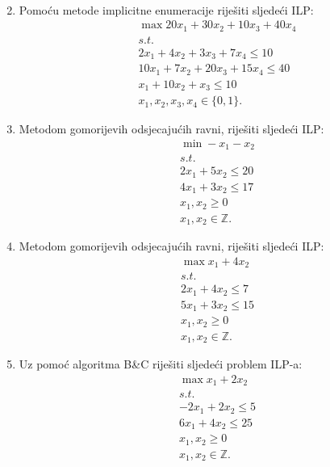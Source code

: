 \documentclass[a4paper, utf8, 11pt, colorlinks]{book}
\begin{document}
\begin{enumerate}
\begin{align*}
\end{align*}
\item  Pomoću metode implicitne enumeracije riješiti sljedeći ILP:
\begin{align*}
	 &\max 20 x_1 + 30 x_2 + 10 x_3 + 40 x_4 \\
	 &s.t. \\
	 & 2x_1 + 4 x_2 + 3 x_3 + 7 x_4 \leq 10 \\
	 & 10 x_1 + 7 x_2 + 20 x_3 + 15 x_4 \leq 40 \\
	 & x_1 + 10 x_2 + x_3 \leq 10 \\
	 & x_1, x_2, x_3, x_4 \in \{0, 1\}.
\end{align*}
	\item Metodom gomorijevih odsjecajućih ravni, riješiti sljedeći ILP:%
	\begin{align*}
		 &\min -x_1 - x_2 \\
		 &s.t.\\
		 & 2 x_1 + 5x_2 \leq 20 \\
		 & 4 x_1 + 3 x_2 \leq 17 \\
		 & x_1, x_2 \geq 0 \\
		 & x_1, x_2 \in \mathbb{Z}.
	\end{align*}
\item Metodom gomorijevih odsjecajućih ravni, riješiti sljedeći ILP:%
\begin{align*}
	& \max x_1 + 4 x_2 \\
	& s.t. \\
	& 2 x_1 + 4 x_2 \leq 7 \\
	& 5 x_1 + 3 x_2 \leq 15 \\
	& x_1, x_2 \geq 0 \\
	& x_1, x_2 \in \mathbb{Z}.
	\end{align*}
\item    %
  Uz pomoć algoritma B\&C riješiti sljedeći problem ILP-a:
  \begin{align*}
  	 &\max x_1 + 2 x_2 \\
  	 &s.t. \\
  	 & -2x_1 + 2 x_2 \leq 5 \\
  	 & 6 x_1 + 4 x_2 \leq 25 \\
  	 & x_1, x_2 \geq 0 \\
  	 & x_1, x_2\in \mathbb{Z}.
  \end{align*}

\end{enumerate}
\end{document}
